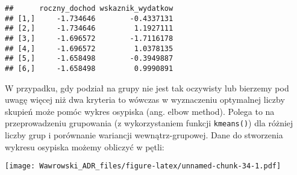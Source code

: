 \documentclass[]{book}
\newenvironment{Shaded}{\begin{snugshade}}{\end{snugshade}}
\newcommand{\KeywordTok}[1]{\textcolor[rgb]{0.13,0.29,0.53}{\textbf{#1}}}
\newcommand{\DataTypeTok}[1]{\textcolor[rgb]{0.13,0.29,0.53}{#1}}
\newcommand{\DecValTok}[1]{\textcolor[rgb]{0.00,0.00,0.81}{#1}}
\newcommand{\StringTok}[1]{\textcolor[rgb]{0.31,0.60,0.02}{#1}}
\newcommand{\CommentTok}[1]{\textcolor[rgb]{0.56,0.35,0.01}{\textit{#1}}}
\newcommand{\ControlFlowTok}[1]{\textcolor[rgb]{0.13,0.29,0.53}{\textbf{#1}}}
\newcommand{\OperatorTok}[1]{\textcolor[rgb]{0.81,0.36,0.00}{\textbf{#1}}}
\newcommand{\NormalTok}[1]{#1}
\begin{document}
\begin{Shaded}
\end{Shaded}

\begin{verbatim}
##      roczny_dochod wskaznik_wydatkow
## [1,]     -1.734646        -0.4337131
## [2,]     -1.734646         1.1927111
## [3,]     -1.696572        -1.7116178
## [4,]     -1.696572         1.0378135
## [5,]     -1.658498        -0.3949887
## [6,]     -1.658498         0.9990891
\end{verbatim}

W przypadku, gdy podział na grupy nie jest tak oczywisty lub bierzemy
pod uwagę więcej niż dwa kryteria to wówczas w wyznaczeniu optymalnej
liczby skupień może pomóc wykres osypiska (ang. elbow method). Polega to
na przeprowadzeniu grupowania (z wykorzystaniem funkcji
\texttt{kmeans()}) dla różniej liczby grup i porównanie wariancji
wewnątrz-grupowej. Dane do stworzenia wykresu osypiska możemy obliczyć w
pętli:

\begin{Shaded}
\end{Shaded}

\texttt{[image: Wawrowski\_ADR\_files/figure-latex/unnamed-chunk-34-1.pdf]}
\end{document}
